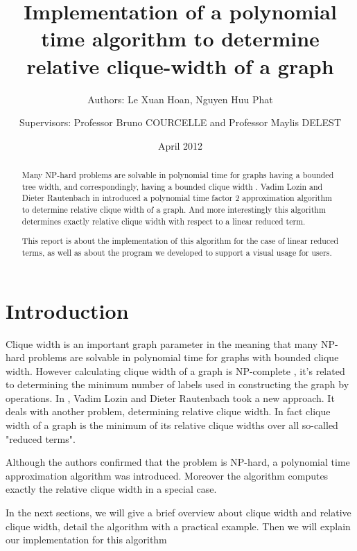\documentclass[a4paper, 12pt]{article}
\begin{document}
\title {Implementation of a polynomial time algorithm to determine relative clique-width of a graph}
\date{April 2012}
\author{Authors: Le Xuan Hoan, Nguyen Huu Phat \\
        \and 
	Supervisors: Professor Bruno COURCELLE and Professor Maylis DELEST}
\maketitle

\begin{abstract}
Many NP-hard problems are solvable in polynomial time for graphs having a bounded tree width, and correspondingly, having a bounded clique width \cite{vadim-lozin}. Vadim Lozin and Dieter Rautenbach in \cite{vadim-lozin} introduced a polynomial time factor 2 approximation algorithm to determine relative clique width of a graph. And more interestingly this algorithm determines exactly relative clique width with respect to a linear reduced term.

This report is about the implementation of this algorithm for the case of linear reduced terms, as well as about the program we developed to support a visual usage for users.
\end{abstract}

\section {Introduction}
Clique width \cite{linear-time} is an important graph parameter in the meaning that many NP-hard problems are solvable in polynomial time for graphs with bounded clique width. However calculating clique width of a graph is NP-complete \cite {np-complete}, it's related to determining the minimum number of labels used in constructing the graph by operations. In \cite {vadim-lozin},  Vadim Lozin and Dieter Rautenbach took a new approach. It deals with another problem, determining relative clique width. In fact clique width of a graph is the minimum of its relative clique widths over all so-called "reduced terms". 

Although the authors confirmed that the problem is NP-hard, a polynomial time approximation algorithm was introduced. Moreover the algorithm computes exactly the relative clique width in a special case.

In the next sections, we will give a brief overview about clique width and relative clique width, detail the algorithm with a practical example. Then we will explain our implementation for this algorithm
\end{document}
